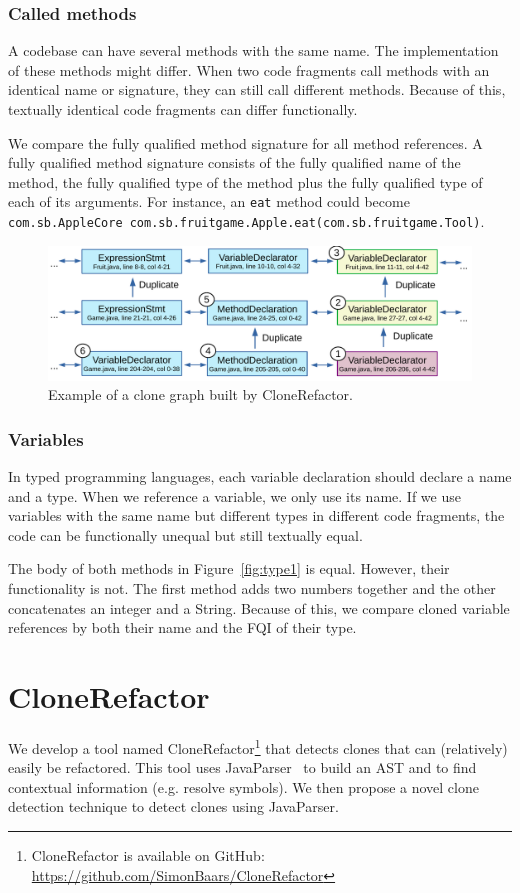 \documentclass[conference]{IEEEtran}
\begin{document}
\subsubsection{Called methods}
A codebase can have several methods with the same name. The implementation of these methods might differ. When two code fragments call methods with an identical name or signature, they can still call different methods. Because of this, textually identical code fragments can differ functionally.

We compare the fully qualified method signature for all method references. A fully qualified method signature consists of the fully qualified name of the method, the fully qualified type of the method plus the fully qualified type of each of its arguments. For instance, an \texttt{eat} method could become \texttt{com.sb.AppleCore com.sb.fruitgame.Apple.eat(com.sb.fruitgame.Tool)}.

\begin{figure}
  \centering
  \includegraphics[width=1\textwidth]{img/CodeGraphExample}
  \caption{Example of a clone graph built by CloneRefactor.}
  \label{fig:clonegraph2}
\end{figure}

\subsubsection{Variables}
In typed programming languages, each variable declaration should declare a name and a type. When we reference a variable, we only use its name. If we use variables with the same name but different types in different code fragments, the code can be functionally unequal but still textually equal.

The body of both methods in Figure~\ref{fig:type1} is equal. However, their functionality is not. The first method adds two numbers together and the other concatenates an integer and a String. Because of this, we compare cloned variable references by both their name and the FQI of their type.

\section{CloneRefactor}
We develop a tool named CloneRefactor\footnote{CloneRefactor is available on GitHub: \url{https://github.com/SimonBaars/CloneRefactor}} that detects clones that can (relatively) easily be refactored. This tool uses JavaParser~\cite{tomassetti2017javaparser} to build an AST and to find contextual information (e.g. resolve symbols). We then propose a novel clone detection technique to detect clones using JavaParser.
\end{document}
